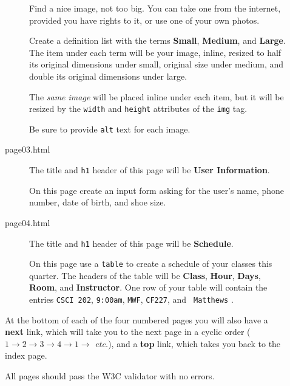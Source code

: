 \documentclass{article}
\begin{document}
\begin{description}
\begin{description}
    Find a nice image, not too big.  You can take one from the
    internet, provided you have rights to it, or use one of your own
    photos.

    Create a definition list with the terms {\bf Small}, {\bf
      Medium}, and {\bf Large}.  The item under each term will be your
    image, inline, resized to half its original dimensions under small,
    original size under medium, and double its original dimensions
    under large.

    The {\em same image} will be placed inline under each
    item, but it will be resized by the {\tt width} and {\tt height}
    attributes of the {\tt img} tag.

    Be sure to provide {\tt alt} text for each image.
    
  \item[page03.html] The title and {\tt h1} header of this page will
    be {\bf User Information}.

    On this page create an input form asking for the user's name,
    phone number, date of birth, and shoe size.
    
  \item[page04.html] The title and {\tt h1} header of this page will
    be {\bf Schedule}.

    On this page use a {\tt table} to create a schedule of your
    classes this quarter.  The headers of the table will be {\bf
      Class}, {\bf Hour}, {\bf Days}, {\bf Room}, and {\bf
      Instructor}.  One row of your table will contain the entries
    {\tt CSCI 202}, {\tt 9:00am}, {\tt MWF}, {\tt CF227}, and {\tt
      Matthews} .

  \end{description}      

  At the bottom of each of the four numbered pages you will also have
  a {\bf next} link, which will take you to the next page in a cyclic
  order ($1\rightarrow 2 \rightarrow 3\rightarrow 4\rightarrow
  1\rightarrow$ {\em etc.}), and
  a {\bf top} link, which takes you back to the index page.

  All pages should pass the W3C validator with no errors.

\end{description}
\end{document}

